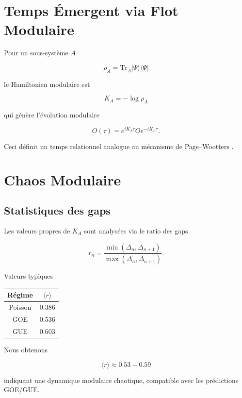 \documentclass[11pt]{article}
\begin{document}

\section{Temps Émergent via Flot Modulaire}

Pour un sous-système $A$

\[
\rho_A = \mathrm{Tr}_{\bar A} |\Psi\rangle\langle\Psi|
\]

le Hamiltonien modulaire est

\[
K_A = -\log\rho_A
\]

qui génère l'évolution modulaire

\[
O(\tau)=e^{iK_A\tau}Oe^{-iK_A\tau}.
\]

Ceci définit un temps relationnel analogue au mécanisme de Page--Wootters \cite{pagewootters}.

\section{Chaos Modulaire}

\subsection{Statistiques des gaps}

Les valeurs propres de $K_A$ sont analysées via le ratio des gaps

\[
r_n=\frac{\min(\Delta_n,\Delta_{n+1})}{\max(\Delta_n,\Delta_{n+1})}.
\]

Valeurs typiques :

\begin{center}
\begin{tabular}{cc}
\toprule
Régime & $\langle r\rangle$ \\
\midrule
Poisson & 0.386 \\
GOE & 0.536 \\
GUE & 0.603 \\
\bottomrule
\end{tabular}
\end{center}

Nous obtenons

\[
\langle r\rangle \approx 0.53-0.59
\]

indiquant une dynamique modulaire chaotique, compatible avec les prédictions GOE/GUE.
\end{document}
